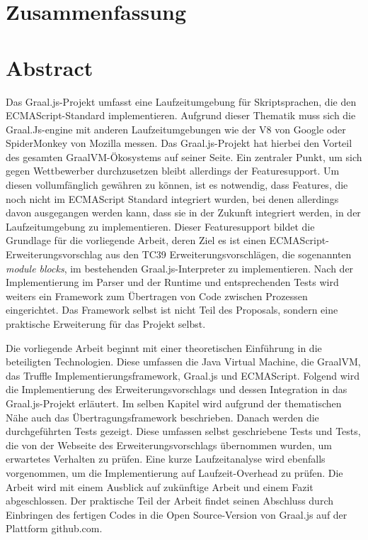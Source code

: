 	{\let\clearpage\relax
	\ifeng	{} \chapter*{Zusammenfassung}
	\else	{} \chapter*{Abstract}
	\fi
		

Das Graal.js-Projekt umfasst eine Laufzeitumgebung für Skriptsprachen, die den ECMAScript-Standard implementieren. Aufgrund dieser Thematik muss sich die Graal.Js-engine mit anderen Laufzeitumgebungen wie der V8 von Google oder SpiderMonkey von Mozilla messen. Das Graal.js-Projekt hat hierbei den Vorteil des gesamten GraalVM-Ökosystems auf seiner Seite. Ein zentraler Punkt, um sich gegen Wettbewerber durchzusetzen bleibt allerdings der Featuresupport. Um diesen vollumfänglich gewähren zu können, ist es notwendig, dass Features, die noch nicht im ECMAScript Standard integriert wurden, bei denen allerdings davon ausgegangen werden kann, dass sie in der Zukunft integriert werden, in der Laufzeitumgebung zu implementieren. Dieser Featuresupport bildet die Grundlage für die vorliegende Arbeit, deren Ziel es ist einen ECMAScript-Erweiterungsvorschlag aus den TC39 Erweiterungsvorschlägen, die sogenannten \emph{module blocks}, im bestehenden Graal.js-Interpreter zu implementieren. Nach der Implementierung im Parser und der Runtime und entsprechenden Tests wird weiters ein Framework zum Übertragen von Code zwischen Prozessen eingerichtet. Das Framework selbst ist nicht Teil des Proposals, sondern eine praktische Erweiterung für das Projekt selbst.

Die vorliegende Arbeit beginnt mit einer theoretischen Einführung in die beteiligten Technologien. Diese umfassen die Java Virtual Machine, die GraalVM, das Truffle Implementierungsframework, Graal.js und ECMAScript. Folgend wird die Implementierung des Erweiterungsvorschlags und dessen Integration in das Graal.js-Projekt erläutert. Im selben Kapitel wird aufgrund der thematischen Nähe auch das Übertragungsframework beschrieben. Danach werden die durchgeführten Tests gezeigt. Diese umfassen selbst geschriebene Tests und Tests, die von der Webseite des Erweiterungsvorschlags übernommen wurden, um erwartetes Verhalten zu prüfen. Eine kurze Laufzeitanalyse wird ebenfalls vorgenommen, um die Implementierung auf Laufzeit-Overhead zu prüfen. Die Arbeit wird mit einem Ausblick auf zukünftige Arbeit und einem Fazit abgeschlossen. Der praktische Teil der Arbeit findet seinen Abschluss durch Einbringen des fertigen Codes in die Open Source-Version von Graal.js auf der Plattform github.com.

}
